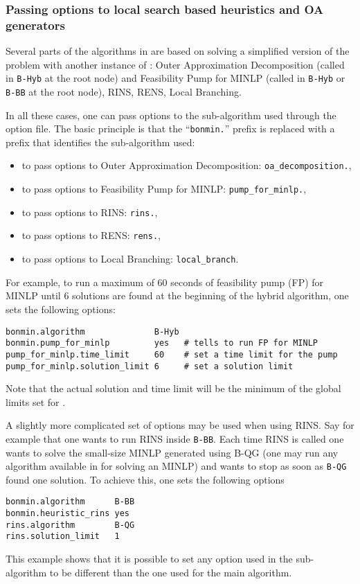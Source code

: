 \subsubsection{Passing options to local search based heuristics and OA generators}
Several parts of the algorithms in \BONMIN are based on solving a simplified version of the problem with another instance of \BONMIN:
Outer Approximation Decomposition (called in {\tt B-Hyb} at the root node)
and Feasibility Pump for MINLP (called in {\tt B-Hyb} or {\tt B-BB} at the root node), RINS, RENS, Local Branching.

In all these cases, one can pass options to the sub-algorithm used through the option file.
The basic principle is that the ``\texttt{bonmin.}'' prefix  is replaced with a prefix that identifies the sub-algorithm used:
\begin{itemize}
\vspace{-2ex}
\setlength{\parskip}{.2ex}
\setlength{\itemsep}{0pt}
\setlength{\partopsep}{0pt}
\item to pass options to Outer Approximation Decomposition: {\tt oa\_decomposition.},
\item to pass options to Feasibility Pump for MINLP: {\tt pump\_for\_minlp.},
\item to pass options to RINS: {\tt rins.},
\item to pass options to RENS: {\tt rens.},
\item to pass options to Local Branching: {\tt local\_branch}.
\end{itemize}

\vspace{-2ex}
For example, to run a maximum of 60 seconds of feasibility pump (FP) for MINLP until 6 solutions are found at the beginning of the hybrid algorithm, one sets the following options:
\begin{verbatim}
bonmin.algorithm              B-Hyb
bonmin.pump_for_minlp         yes   # tells to run FP for MINLP
pump_for_minlp.time_limit     60    # set a time limit for the pump
pump_for_minlp.solution_limit 6     # set a solution limit
\end{verbatim}
Note that the actual solution and time limit will be the minimum of the global limits set for \BONMIN.

A slightly more complicated set of options may be used when using RINS.
Say for example that one wants to run RINS inside \texttt{B-BB}.
Each time RINS is called one wants to solve the small-size MINLP generated using B-QG (one may run any algorithm available in \BONMIN for solving an MINLP) and wants to stop as soon as \texttt{B-QG} found one solution.
To achieve this, one sets the following options
\begin{verbatim}
bonmin.algorithm      B-BB
bonmin.heuristic_rins yes
rins.algorithm        B-QG
rins.solution_limit   1
\end{verbatim}
This example shows that it is possible to set any option used in the sub-algorithm to be different than the one used for the main algorithm.

